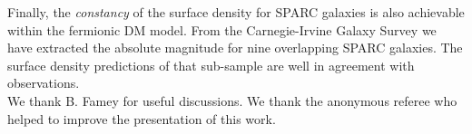\begin{description}


Finally, the \textit{constancy} of the surface density \citep{2009MNRAS.397.1169D} for SPARC galaxies is also achievable within the fermionic DM model. From the Carnegie-Irvine Galaxy Survey \citep{2011ApJS..197...21H} we have extracted the absolute magnitude for nine overlapping SPARC galaxies. The surface density predictions of that sub-sample are well in agreement with observations.\\ %

We thank B. Famey for useful discussions. We thank the anonymous referee who helped to improve the presentation of this work.
\end{description}






